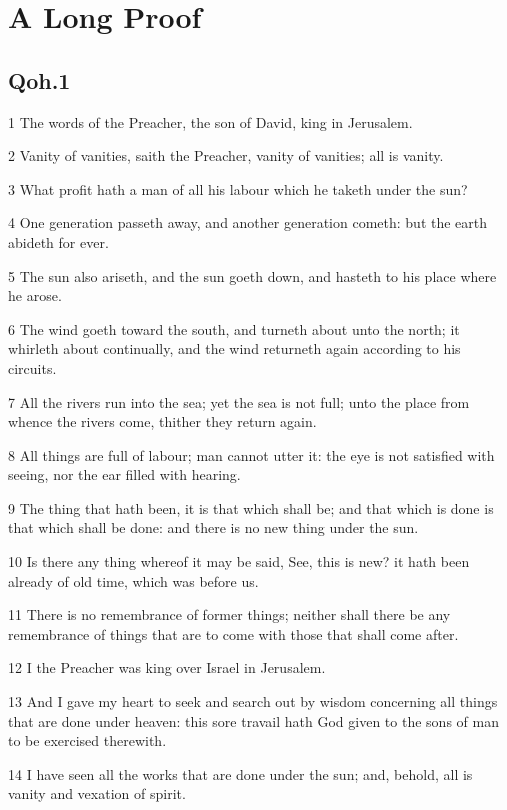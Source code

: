 \documentclass[12pt,twoside]{report}
\begin{document}
    \appendix
    \chapter{A Long Proof}

\section{Qoh.1}

1 The words of the Preacher, the son of David, king in Jerusalem.

2 Vanity of vanities, saith the Preacher, vanity of vanities; all is
vanity.

3 What profit hath a man of all his labour which he taketh under the
sun?

4 One generation passeth away, and another generation cometh: but the
earth abideth for ever.

5 The sun also ariseth, and the sun goeth down, and hasteth to his
place where he arose.

6 The wind goeth toward the south, and turneth about unto the north;
it whirleth about continually, and the wind returneth again according
to his circuits.

7 All the rivers run into the sea; yet the sea is not full; unto the
place from whence the rivers come, thither they return again.

   
8 All things are full of labour; man cannot utter it: the eye is
   not
   satisfied with seeing, nor the ear filled with hearing.
   
9 The thing that hath been, it is that which shall be; and that
   which is done is that which shall be done: and there is no new
   thing
   under the sun.
   
10 Is there any thing whereof it may be said, See, this is new?
   it
   hath been already of old time, which was before us.
   
11 There is no remembrance of former things; neither shall there
   be
   any remembrance of things that are to come with those that shall
   come
   after.
   
12 I the Preacher was king over Israel in Jerusalem.
   
13 And I gave my heart to seek and search out by wisdom
   concerning
   all things that are done under heaven: this sore travail hath God
   given to the sons of man to be exercised therewith.
   
14 I have seen all the works that are done under the sun; and,
   behold, all is vanity and vexation of spirit.
   
\end{document}

